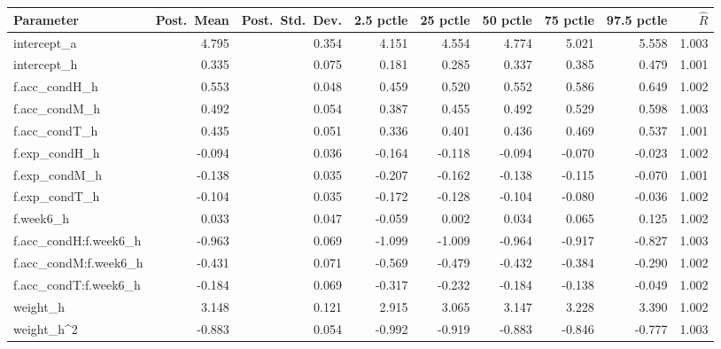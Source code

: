 \begin{tabular}{lrrrrrrrr}
\toprule
Parameter & Post.\ Mean & Post.\ Std.\ Dev. & 2.5 pctle & 25 pctle & 50 pctle & 75 pctle & 97.5 pctle & $\hat{R}$ \\
\midrule
intercept\_a & 4.795 & 0.354 & 4.151 & 4.554 & 4.774 & 5.021 & 5.558 & 1.003 \\
intercept\_h & 0.335 & 0.075 & 0.181 & 0.285 & 0.337 & 0.385 & 0.479 & 1.001 \\
f.acc\_condH\_h & 0.553 & 0.048 & 0.459 & 0.520 & 0.552 & 0.586 & 0.649 & 1.002 \\
f.acc\_condM\_h & 0.492 & 0.054 & 0.387 & 0.455 & 0.492 & 0.529 & 0.598 & 1.003 \\
f.acc\_condT\_h & 0.435 & 0.051 & 0.336 & 0.401 & 0.436 & 0.469 & 0.537 & 1.001 \\
f.exp\_condH\_h & -0.094 & 0.036 & -0.164 & -0.118 & -0.094 & -0.070 & -0.023 & 1.002 \\
f.exp\_condM\_h & -0.138 & 0.035 & -0.207 & -0.162 & -0.138 & -0.115 & -0.070 & 1.001 \\
f.exp\_condT\_h & -0.104 & 0.035 & -0.172 & -0.128 & -0.104 & -0.080 & -0.036 & 1.002 \\
f.week6\_h & 0.033 & 0.047 & -0.059 & 0.002 & 0.034 & 0.065 & 0.125 & 1.002 \\
f.acc\_condH:f.week6\_h & -0.963 & 0.069 & -1.099 & -1.009 & -0.964 & -0.917 & -0.827 & 1.003 \\
f.acc\_condM:f.week6\_h & -0.431 & 0.071 & -0.569 & -0.479 & -0.432 & -0.384 & -0.290 & 1.002 \\
f.acc\_condT:f.week6\_h & -0.184 & 0.069 & -0.317 & -0.232 & -0.184 & -0.138 & -0.049 & 1.002 \\
weight\_h & 3.148 & 0.121 & 2.915 & 3.065 & 3.147 & 3.228 & 3.390 & 1.002 \\
weight\_h^2 & -0.883 & 0.054 & -0.992 & -0.919 & -0.883 & -0.846 & -0.777 & 1.003 \\
\bottomrule
\end{tabular}
